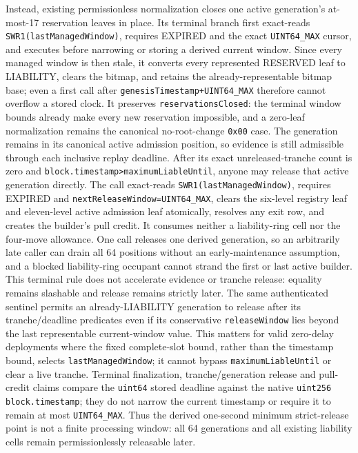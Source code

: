 \documentclass[a4paper,11pt]{article}
\newcommand{\code}[1]{\nolinkurl{#1}}
\begin{document}
Instead, existing permissionless normalization closes one active generation's
at-most-17 reservation leaves in place.  Its terminal branch first exact-reads
\code{SWR1(lastManagedWindow)}, requires EXPIRED and the exact
\code{UINT64_MAX} cursor, and executes before narrowing or storing a derived
current window.  Since every managed window is then stale, it converts every
represented RESERVED leaf to LIABILITY, clears the bitmap, and retains the
already-representable bitmap base; even a first call after
\code{genesisTimestamp+UINT64_MAX} therefore cannot overflow a stored clock.
It preserves \code{reservationsClosed}: the terminal window bounds already
make every new reservation impossible, and a zero-leaf normalization remains
the canonical no-root-change \code{0x00} case.
The generation remains in its canonical active admission position, so evidence
is still admissible through each inclusive replay deadline.  After its exact
unreleased-tranche count is zero and
\code{block.timestamp>maximumLiableUntil}, anyone may release that active
generation directly.  The call exact-reads
\code{SWR1(lastManagedWindow)}, requires EXPIRED and
\code{nextReleaseWindow=UINT64_MAX}, clears the six-level registry leaf and
eleven-level active admission leaf atomically, resolves any exit row, and
creates the builder's pull credit.  It consumes neither a liability-ring cell
nor the four-move allowance.  One call releases one derived generation, so an
arbitrarily late caller can drain all 64 positions without an early-maintenance
assumption, and a blocked liability-ring occupant cannot strand the first or
last active builder.  This terminal rule does not accelerate evidence or
tranche release: equality remains slashable and release remains strictly later.
The same authenticated sentinel permits an already-LIABILITY generation to
release after its tranche/deadline predicates even if its conservative
\code{releaseWindow} lies beyond the last representable current-window value.
This matters for valid zero-delay deployments where the fixed complete-slot
bound, rather than the timestamp bound, selects \code{lastManagedWindow}; it
cannot bypass \code{maximumLiableUntil} or clear a live tranche.
Terminal finalization, tranche/generation release and pull-credit claims compare
the \code{uint64} stored deadline against the native \code{uint256}
\code{block.timestamp}; they do not narrow the current timestamp or require it
to remain at most \code{UINT64_MAX}.  Thus the derived one-second minimum
strict-release point is not a finite processing window: all 64 generations and
all existing liability cells remain permissionlessly releasable later.
\end{document}
